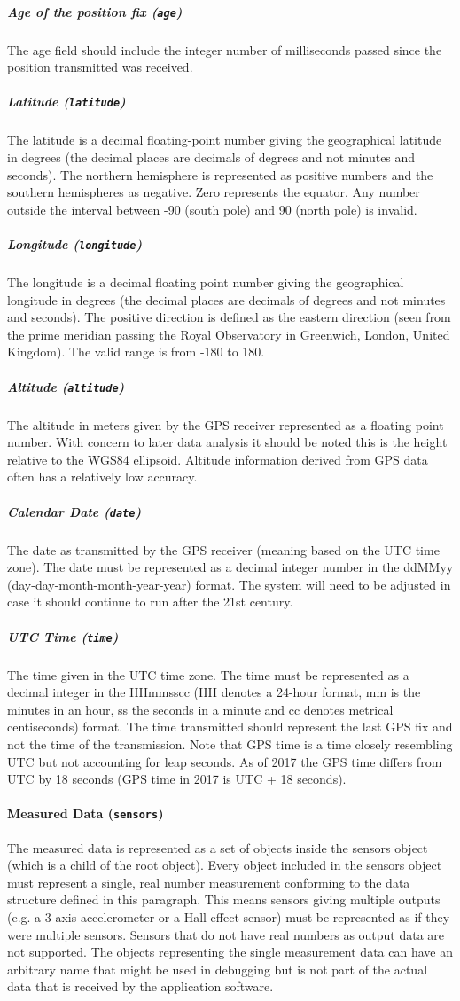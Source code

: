 \subparagraph{Age of the position fix (\texttt{age})}
The age field should include the integer number of milliseconds passed since the position transmitted was received.

\subparagraph{Latitude (\texttt{latitude})}
The latitude is a decimal floating-point number giving the geographical latitude in degrees (the decimal places are decimals of degrees and not minutes and seconds). The northern hemisphere is represented as positive numbers and the southern hemispheres as negative. Zero represents the equator. Any number outside the interval between -90 (south pole) and 90 (north pole) is invalid.

\subparagraph{Longitude (\texttt{longitude})}
The longitude is a decimal floating point number giving the geographical longitude in degrees (the decimal places are decimals of degrees and not minutes and seconds). The positive direction is defined as the eastern direction (seen from the prime meridian passing the Royal Observatory in Greenwich, London, United Kingdom). The valid range is from -180 to 180.

\subparagraph{Altitude (\texttt{altitude})}
The altitude in meters given by the GPS receiver represented as a floating point number. With concern to later data analysis it should be noted this is the height relative to the WGS84 ellipsoid. Altitude information derived from GPS data often has a relatively low accuracy.

\subparagraph{Calendar Date (\texttt{date})}
The date as transmitted by the GPS receiver (meaning based on the UTC time zone). The date must be represented as a decimal integer number in the ddMMyy (day-day-month-month-year-year) format. The system will need to be adjusted in case it should continue to run after the 21st century. 

\subparagraph{UTC Time (\texttt{time})}
The time given in the UTC time zone. The time must be represented as a decimal integer in the HHmmsscc (HH denotes a 24-hour format, mm is the minutes in an hour, ss the seconds in a minute and cc denotes metrical centiseconds) format. The time transmitted should represent the last GPS fix and not the time of the transmission. Note that GPS time is a time closely resembling UTC but not accounting for leap seconds. As of 2017 the GPS time differs from UTC by 18 seconds (GPS time in 2017 is UTC + 18 seconds).

\paragraph{Measured Data  (\texttt{sensors})}
The measured data is represented as a set of objects inside the sensors object (which is a child of the root object). Every object included in the sensors object must represent a single, real number measurement conforming to the data structure defined in this paragraph. This means sensors giving multiple outputs (e.g. a 3-axis accelerometer or a Hall effect sensor) must be represented as if they were multiple sensors. Sensors that do not have real numbers as output data are not supported. The objects representing the single measurement data can have an arbitrary name that might be used in debugging but is not part of the actual data that is received by the application software.

